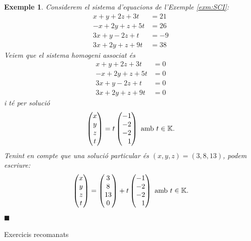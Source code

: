 \documentclass[
  11pt,
]{book}
\makeatletter
\numberwithin{dummy}{section}
\theoremstyle{maincolornumbox}
\theoremstyle{blacknumex}
\newtheorem{exampleT}{Exemple}[chapter]
\theoremstyle{blacknumbox}
\theoremstyle{maincolornum}
\newenvironment{example}{\begin{exampleT}}{\hfill{\tiny\ensuremath{\blacksquare}}\end{exampleT}}
\renewcommand{\section}{\@startsection{section}{1}{\z@}
{-4ex \@plus -1ex \@minus -.4ex}
{1ex \@plus.2ex }
{\normalfont\large\sffamily\bfseries}}
\makeatother
\begin{document}
\begin{example}
Considerem el sistema d'equacions de l'Exemple
\ref{exm:SCI}:
\begin{align*}
    x + y + 2z + 3t &= 21 \\
    -x+2y+z+5t&=26\\
    3x+y-2z+t&=-9\\
    3x+2y+z+9t&=38
\end{align*} Veiem que el sistema homogeni associat és
\begin{align*}
    x + y + 2z + 3t &= 0\\
    -x+2y+z+5t&=0\\
    3x+y-2z+t&=0\\
    3x+2y+z+9t&=0
\end{align*} i té per solució \[\begin{pmatrix}
    x \\ y \\ z \\ t
    \end{pmatrix} =
    t \begin{pmatrix}
    -1 \\ -2 \\ -2 \\ \phantom{-}1
    \end{pmatrix} \text{ amb $t\in\mathbb{K}$.}\] Tenint en compte que una solució
particular és \((x,y,z)=(3,8,13)\), podem escriure: \[\begin{pmatrix}
    x \\ y \\ z \\ t
    \end{pmatrix} =
    \begin{pmatrix}
    3 \\ 8 \\ 13 \\ 0
    \end{pmatrix}+
    t \begin{pmatrix}
    -1 \\ -2 \\ -2 \\ \phantom{-}1
    \end{pmatrix} \text{ amb $t\in\mathbb{K}$.}\]
\end{example}

\hypertarget{exercicis-recomanats}{%
\section{Exercicis recomanats}\label{exercicis-recomanats}}
\end{document}
